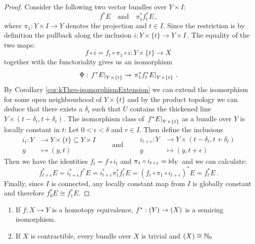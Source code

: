 \begin{proof}
	Consider the following two vector bundles over $Y\times I$:
	\begin{equation*}
		f^*E \quad \text{and} \quad \pi_1^*f_t^*E \,,
	\end{equation*}where $\pi_1:Y\times I\to Y$ denotes the projection and $t\in I$. 
Since the restriction is by definition the pullback along the inclusion 
$	i:Y\times \{t\}\to Y\times I\,.$ The equality of the two maps:
\begin{equation*}
	f\circ i = f_t \circ \pi_1 \circ i :Y\times\{t\} \to X\,
\end{equation*} together with the functoriality gives us an isomorphism 
\begin{equation*}
\Phi:	\left.f^*E\right|_{Y\times\{t\}} \to \left.\pi_1^*f_t^*E\right|_{Y\times\{t\}}\,.
\end{equation*}
By Corollary \ref{cor:kTheo-isomorphismExtension} we can extend the isomorphism  for some open neighbourhood of $Y\times \{t\}$ and by the product topology we can deduce that there exists a $\delta_t$ such that $U$ contains the thickened line $Y\times (t-\delta_t,t+\delta_t) $. The isomorphism class of $\left.f^*E\right|_{Y\times \{t\}}$ as a bundle over $Y$ is locally constant in $t$: Let $0<\epsilon<\delta$ and $r\in I$. Then define the inclusions
	\begin{equation*}
			\begin{array}{rl}
				i_t: Y&\to Y\times \{t\}\subseteq Y\times I \\
				y &\mapsto (y,t)
			\end{array}
		\quad\quad \text{and}\quad \quad
			\begin{array}{rl}
				i_{t+\epsilon}:Y&\to Y\times (t-\delta_t,t+\delta_t)\\
				y &\mapsto (y,t+\epsilon)
			\end{array}
	\end{equation*} Then we have the identities $f_t=f\circ i_t$ and $\pi_1\circ i_{t+\varepsilon}=\operatorname{\mathrm{id}}_Y$ and we can calculate:
	\begin{equation*}
		f^*_{t+\epsilon}E=i_{t+\epsilon}^*f^*E=i_{t+\epsilon}^*\pi_1^*f_t^*E=(f_t\circ \pi_1\circ i_{t+\epsilon})^*E=f_t^*E\,.
	\end{equation*} Finally, since $I$ is connected, any locally constant map from $I$ is globally constant and therefore $f_0^*E\cong f_1^*E$.
\end{proof}

\begin{corollary}
		\label{lem:kTheo-contractibleBundlesAreTivial}
	\begin{enumerate}
		\item If $f:X\to Y$ is a homotopy equivalence, $f^*:\relax(Y)\to \relax(X)$ is a semiring isomorphism.
		\item If $X$ is contractible, every bundle over $X$ is trivial and $\relax(X)\cong \mathbb{N}_0$
	\end{enumerate}
\end{corollary}

